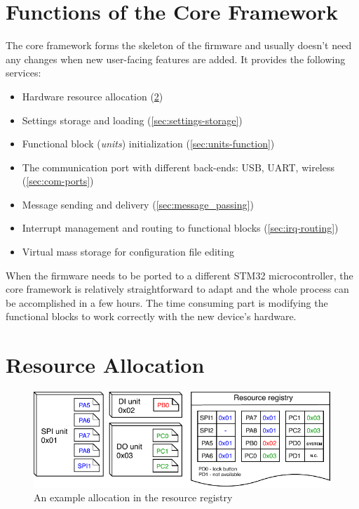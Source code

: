 \section{Functions of the Core Framework}

The core framework forms the skeleton of the firmware and usually doesn't need any changes when new user-facing features are added. It provides the following services:

\begin{itemize}
	\item Hardware resource allocation (\ref{sec:res-allocation})
	\item Settings storage and loading (\ref{sec:settings-storage})
	\item Functional block (\textit{units}) initialization (\ref{sec:units-function})
	\item The communication port with different back-ends: USB, UART, wireless (\ref{sec:com-ports})
	\item Message sending and delivery (\ref{sec:message_passing})
	\item Interrupt management and routing to functional blocks (\ref{sec:irq-routing})
	\item Virtual mass storage for configuration file editing
\end{itemize}

When the firmware needs to be ported to a different STM32 microcontroller, the core framework is relatively straightforward to adapt and the whole process can be accomplished in a few hours. The time consuming part is modifying the functional blocks to work correctly with the new device's hardware. 


\section{Resource Allocation} \label{sec:res-allocation}

\begin{figure}[h]
	\centering
	\includegraphics[scale=1] {img/resource-repository.pdf}
	\caption{\label{fig:resource-repository}An example allocation in the resource registry}
\end{figure}

